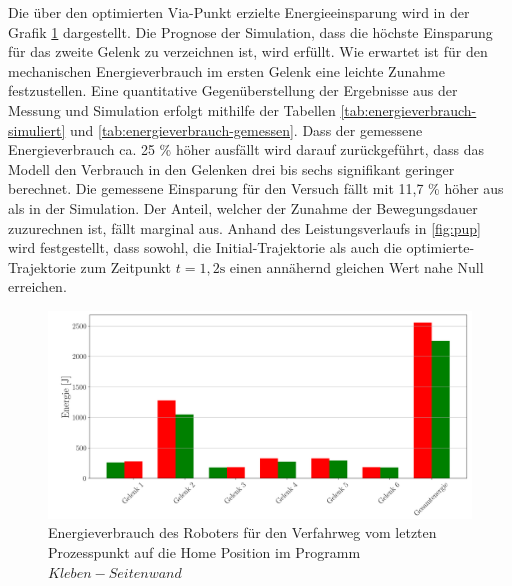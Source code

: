 Die über den optimierten Via-Punkt erzielte Energieeinsparung wird in der Grafik \ref{fig:eup500} dargestellt. Die Prognose der Simulation, dass die höchste Einsparung für das zweite Gelenk zu verzeichnen ist, wird erfüllt. Wie erwartet ist für den mechanischen Energieverbrauch im ersten Gelenk eine leichte Zunahme festzustellen. Eine quantitative Gegenüberstellung der Ergebnisse aus der Messung und  Simulation erfolgt mithilfe der Tabellen \ref{tab:energieverbrauch-simuliert} und \ref{tab:energieverbrauch-gemessen}. Dass der gemessene Energieverbrauch ca. 25 \% höher ausfällt wird darauf zurückgeführt, dass das Modell den Verbrauch in den Gelenken drei bis sechs signifikant geringer berechnet. Die gemessene Einsparung für den Versuch  fällt mit 11,7 \% höher aus als in der Simulation. Der Anteil, welcher der Zunahme der Bewegungsdauer zuzurechnen ist, fällt marginal aus. Anhand des Leistungsverlaufs in \ref{fig:pup} wird festgestellt, dass sowohl, die Initial-Trajektorie als auch die optimierte-Trajektorie zum Zeitpunkt $t=1,2\text{s}$ einen annähernd gleichen Wert nahe Null erreichen. 
%
\begin{figure}[tbph]
	\centering
	\includegraphics[width=1\linewidth]{images/e_up500}
	\caption{Energieverbrauch des Roboters für den Verfahrweg vom letzten Prozesspunkt auf die  Home Position im Programm $Kleben-Seitenwand$}
	\label{fig:eup500}        
\end{figure}
%
